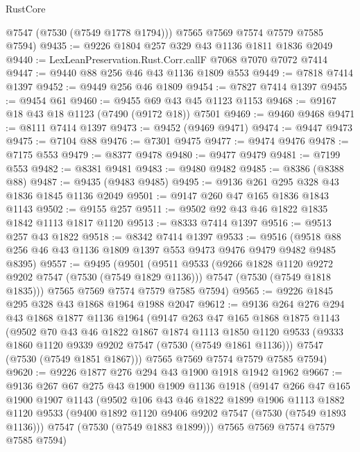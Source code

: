 \begin{lexlean}{RustCore}
\begin{coremodule}
        @7547
        (@7530 (@7549 @1778 @1794)))
      @7565
      @7569
      @7574
      @7579
      @7585
      @7594)
@9435 := @9226 @1804 @257 @329 @43 @1136 @1811 @1836 @2049
@9440 := LexLeanPreservation.Rust.Corr.callF @7068 @7070 @7072 @7414
@9447 := @9440 @88 @256 @46 @43 @1136 @1809 @553
@9449 := @7818 @7414 @1397
@9452 := @9449 @256 @46 @1809
@9454 := @7827 @7414 @1397
@9455 := @9454 @61
@9460 := @9455 @69 @43 @45 @1123 @1153
@9468 := @9167 @18 @43 @18 @1123 (@7490 (@9172 @18)) @7501
@9469 := @9460 @9468
@9471 := @8111 @7414 @1397
@9473 := @9452 (@9469 @9471)
@9474 := @9447 @9473
@9475 := @7104 @88
@9476 := @7301 @9475
@9477 := @9474 @9476
@9478 := @7175 @553
@9479 := @8377 @9478
@9480 := @9477 @9479
@9481 := @7199 @553
@9482 := @8381 @9481
@9483 := @9480 @9482
@9485 := @8386 (@8388 @88)
@9487 := @9435 (@9483 @9485)
@9495 := @9136 @261 @295 @328 @43 @1836 @1845 @1136 @2049
@9501 := @9147 @260 @47 @165 @1836 @1843 @1143
@9502 := @9155 @257
@9511 := @9502 @92 @43 @46 @1822 @1835 @1842 @1113 @1817 @1120
@9513 := @8333 @7414 @1397
@9516 := @9513 @257 @43 @1822
@9518 := @8342 @7414 @1397
@9533 := @9516 (@9518 @88 @256 @46 @43 @1136 @1809 @1397 @553 @9473 @9476 @9479 @9482 @9485 @8395)
@9557 := @9495
    (@9501
      (@9511
        @9533
        (@9266 @1828 @1120 @9272 @9202 @7547 (@7530 (@7549 @1829 @1136)))
        @7547
        (@7530 (@7549 @1818 @1835)))
      @7565
      @7569
      @7574
      @7579
      @7585
      @7594)
@9565 := @9226 @1845 @295 @328 @43 @1868 @1964 @1988 @2047
@9612 := @9136
    @264
    @276
    @294
    @43
    @1868
    @1877
    @1136
    @1964
    (@9147
      @263
      @47
      @165
      @1868
      @1875
      @1143
      (@9502
        @70
        @43
        @46
        @1822
        @1867
        @1874
        @1113
        @1850
        @1120
        @9533
        (@9333 @1860 @1120 @9339 @9202 @7547 (@7530 (@7549 @1861 @1136)))
        @7547
        (@7530 (@7549 @1851 @1867)))
      @7565
      @7569
      @7574
      @7579
      @7585
      @7594)
@9620 := @9226 @1877 @276 @294 @43 @1900 @1918 @1942 @1962
@9667 := @9136
    @267
    @67
    @275
    @43
    @1900
    @1909
    @1136
    @1918
    (@9147
      @266
      @47
      @165
      @1900
      @1907
      @1143
      (@9502
        @106
        @43
        @46
        @1822
        @1899
        @1906
        @1113
        @1882
        @1120
        @9533
        (@9400 @1892 @1120 @9406 @9202 @7547 (@7530 (@7549 @1893 @1136)))
        @7547
        (@7530 (@7549 @1883 @1899)))
      @7565
      @7569
      @7574
      @7579
      @7585
      @7594)

\end{coremodule}
\end{lexlean}
